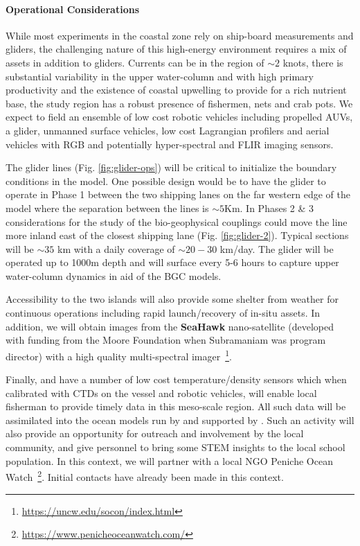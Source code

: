 \paragraph{Operational Considerations} While most experiments in the
coastal zone rely on ship-board measurements and gliders, the
challenging nature of this high-energy environment requires a mix of
assets in addition to gliders. Currents can be in the region of
$\sim 2$ knots, there is substantial variability in the upper
water-column and with high primary productivity and the existence of
coastal upwelling to provide for a rich nutrient base, the study
region has a robust presence of fishermen, nets and crab pots. We
expect to field an ensemble of low cost robotic vehicles including
propelled AUVs, a glider, unmanned surface vehicles, low cost
Lagrangian profilers and aerial vehicles with RGB and potentially
hyper-spectral and FLIR imaging sensors.

The glider lines (Fig. \ref{fig:glider-ops}) will be critical to
initialize the boundary conditions in the model. One possible design
would be to have the glider to operate in Phase 1 between the two
shipping lanes on the far western edge of the model where the
separation between the lines is $\sim 5$Km. In Phases 2 \& 3
considerations for the study of the bio-geophysical couplings could
move the line more inland east of the closest shipping lane
(Fig. \ref{fig:glider-2}). Typical sections will be $\sim 35$ km with
a daily coverage of $\sim 20-30$ km/day. The glider will be operated
up to 1000m depth and will surface every 5-6 hours to capture upper
water-column dynamics in aid of the BGC models.

Accessibility to the two islands will also provide some shelter from
weather for continuous operations including rapid launch/recovery of
in-situ assets. In addition, we will obtain images from the
\textbf{SeaHawk} nano-satellite (developed with funding from the Moore
Foundation when Subramaniam was program director) with a high quality
multi-spectral
imager~\footnote{\url{https://uncw.edu/socon/index.html}}.

Finally, \univ and \inst have a number of low cost temperature/density
sensors which when calibrated with CTDs on the vessel and robotic
vehicles, will enable local fisherman to provide timely data in this
meso-scale region. All such data will be assimilated into the ocean
models run by \inst and supported by \mite.  Such an activity will
also provide an opportunity for outreach and involvement by the local
community, and give \proj personnel to bring some STEM insights to the
local school population. In this context, we will partner with a local
NGO Peniche Ocean
Watch~\footnote{\url{https://www.penicheoceanwatch.com/}}. Initial
contacts have already been made in this context.

